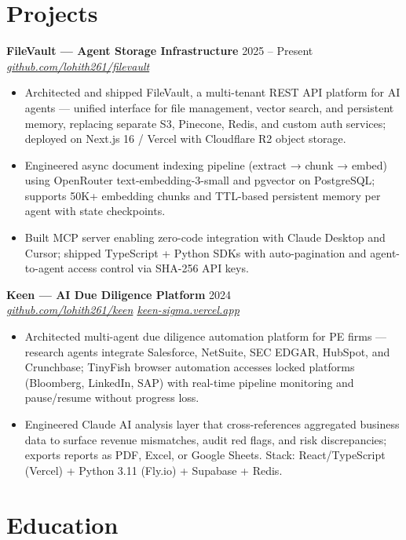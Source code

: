 \documentclass[10pt,letterpaper]{article}
\newcommand{\entry}[3]{%
  \vspace{3pt}\textbf{#1} \hfill #3 \\
  \textit{\small #2}\vspace{1pt}}
\begin{document}
\section{Projects}

\entry{FileVault --- Agent Storage Infrastructure}{\href{https://github.com/lohith261/filevault}{github.com/lohith261/filevault}}{2025 -- Present}
\begin{itemize}
  \item Architected and shipped FileVault, a multi-tenant REST API platform for AI agents --- unified interface for file management, vector search, and persistent memory, replacing separate S3, Pinecone, Redis, and custom auth services; deployed on Next.js 16 / Vercel with Cloudflare R2 object storage.
  \item Engineered async document indexing pipeline (extract → chunk → embed) using OpenRouter text-embedding-3-small and pgvector on PostgreSQL; supports 50K+ embedding chunks and TTL-based persistent memory per agent with state checkpoints.
  \item Built MCP server enabling zero-code integration with Claude Desktop and Cursor; shipped TypeScript + Python SDKs with auto-pagination and agent-to-agent access control via SHA-256 API keys.
\end{itemize}

\entry{Keen --- AI Due Diligence Platform}{\href{https://github.com/lohith261/keen}{github.com/lohith261/keen} \quad\textbullet\quad \href{https://keen-sigma.vercel.app/}{keen-sigma.vercel.app}}{2024}
\begin{itemize}
  \item Architected multi-agent due diligence automation platform for PE firms --- research agents integrate Salesforce, NetSuite, SEC EDGAR, HubSpot, and Crunchbase; TinyFish browser automation accesses locked platforms (Bloomberg, LinkedIn, SAP) with real-time pipeline monitoring and pause/resume without progress loss.
  \item Engineered Claude AI analysis layer that cross-references aggregated business data to surface revenue mismatches, audit red flags, and risk discrepancies; exports reports as PDF, Excel, or Google Sheets. Stack: React/TypeScript (Vercel) + Python 3.11 (Fly.io) + Supabase + Redis.
\end{itemize}

\section{Education}
\end{document}
